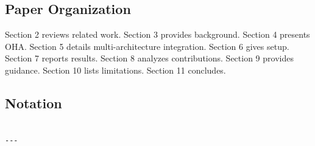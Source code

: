 \subsection{Paper Organization}

Section 2 reviews related work. Section 3 provides background. Section 4 
presents OHA. Section 5 details multi-architecture integration. Section 6 
gives setup. Section 7 reports results. Section 8 analyzes contributions. 
Section 9 provides guidance. Section 10 lists limitations. Section 11 
concludes.



\subsection{Notation}

\begin{lstlisting}

---
\end{lstlisting}